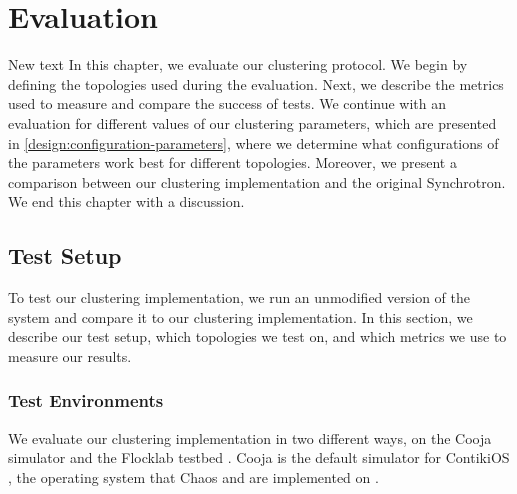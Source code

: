 \chapter{Evaluation}
\label{chap:evaluation}
\begin{newtext}{New text}
In this chapter, we evaluate our clustering protocol. We begin by defining the topologies used during the evaluation. Next, we describe the metrics used to measure and compare the success of tests. We continue with an evaluation for different values of our clustering parameters, which are presented in \cref{design:configuration-parameters}, where we determine what configurations of the parameters work best for different topologies. Moreover, we present a comparison between our clustering implementation and the original \atwo{} Synchrotron. We end this chapter with a discussion.
\end{newtext}

\section{Test Setup}
To test our clustering implementation, we run an unmodified version of the \atwo{} system and compare it to our clustering implementation. In this section, we describe our test setup, which topologies we test on, and which metrics we use to measure our results. 


\subsection{Test Environments}
We evaluate our clustering implementation in two different ways, on the Cooja simulator \cite{Osterlind2006-cooja-introduction} and the Flocklab testbed \cite{Lim2013-flocklab-introduction}. Cooja is the default simulator for ContikiOS \cite{Dunkels2004-contiki-introduction}, the operating system that Chaos and \atwo{} are implemented on \cite{chaos-introduction-paper, a2-introduction-paper}.

